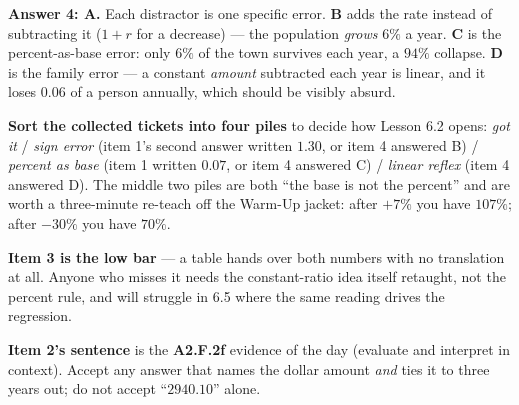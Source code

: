 \documentclass[10pt]{article}
\begin{document}
\begin{teachernote}
\textbf{Answer 4: A.} Each distractor is one specific error. \textbf{B} adds the rate instead of
subtracting it ($1+r$ for a decrease) --- the population \emph{grows} $6\%$ a year. \textbf{C} is the
percent-as-base error: only $6\%$ of the town survives each year, a $94\%$ collapse. \textbf{D} is
the family error --- a constant \emph{amount} subtracted each year is linear, and it loses
$0.06$ of a person annually, which should be visibly absurd.

\textbf{Sort the collected tickets into four piles} to decide how Lesson 6.2 opens:
\emph{got it} / \emph{sign error} (item 1's second answer written $1.30$, or item 4 answered B) /
\emph{percent as base} (item 1 written $0.07$, or item 4 answered C) / \emph{linear reflex}
(item 4 answered D). The middle two piles are both ``the base is not the percent'' and are worth a
three-minute re-teach off the Warm-Up jacket: after $+7\%$ you have $107\%$; after $-30\%$ you have
$70\%$.

\textbf{Item 3 is the low bar} --- a table hands over both numbers with no translation at all.
Anyone who misses it needs the constant-ratio idea itself retaught, not the percent rule, and will
struggle in 6.5 where the same reading drives the regression.

\textbf{Item 2's sentence} is the \textbf{A2.F.2f} evidence of the day (evaluate and interpret in
context). Accept any answer that names the dollar amount \emph{and} ties it to three years out; do
not accept ``$2940.10$'' alone.
\end{teachernote}
\end{document}
